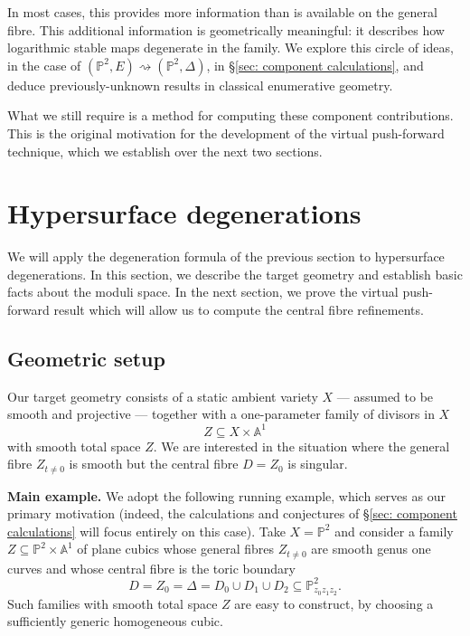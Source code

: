\documentclass[11pt]{amsart}
\newcommand{\runningexample}{\noindent \textbf{Main example.} }
\theoremstyle{definition}
\theoremstyle{definition}
\newcommand{\Aaff}{\mathbb{A}}
\newcommand{\PP}{\mathbb{P}}
\begin{document}
In most cases, this provides more information than is available on the general fibre. This additional information is geometrically meaningful: it describes how logarithmic stable maps degenerate in the family. We explore this circle of ideas, in the case of $(\PP^2,E) \rightsquigarrow (\PP^2,\Delta)$, in \S \ref{sec: component calculations}, and deduce previously-unknown results in classical enumerative geometry.

What we still require is a method for computing these component contributions. This is the original motivation for the development of the virtual push-forward technique, which we establish over the next two sections.

\section{Hypersurface degenerations}\label{sec: preliminaries}\label{sec: hypersurface degenerations}
\noindent We will apply the degeneration formula of the previous section to hypersurface degenerations. In this section, we describe the target geometry and establish basic facts about the moduli space. In the next section, we prove the virtual push-forward result which will allow us to compute the central fibre refinements.

\subsection{Geometric setup} Our target geometry consists of a static ambient variety $X$ --- assumed to be smooth and projective --- together with a one-parameter family of divisors in $X$
\begin{equation*} Z \subseteq X \times \Aaff^{\! 1} \end{equation*}
with smooth total space $Z$. We are interested in the situation where the general fibre $Z_{t \neq 0}$ is smooth but the central fibre $D=Z_0$ is singular.

\runningexample We adopt the following running example, which serves as our primary motivation (indeed, the calculations and conjectures of \S\ref{sec: component calculations} will focus entirely on this case). Take $X=\PP^2$ and consider a family $Z \subseteq \PP^2 \times \Aaff^{\! 1}$ of plane cubics whose general fibres $Z_{t\neq 0}$ are smooth genus one curves and whose central fibre is the toric boundary
\begin{equation*} D = Z_0 = \Delta = D_0 \cup D_1 \cup D_2 \subseteq \PP^2_{z_0 z_1 z_2}. \end{equation*}
Such families with smooth total space $Z$ are easy to construct, by choosing a sufficiently generic homogeneous cubic.
\end{document}
